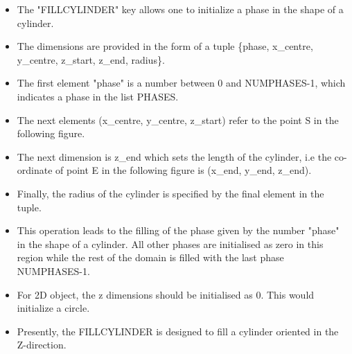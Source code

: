 \documentclass[a4paper,10pt]{article}
\begin{document}
\begin{itemize}
 \item The "FILLCYLINDER" key allows one to initialize a phase in the shape of a cylinder.
 \item The dimensions are provided in the form of a tuple \{phase, x\_centre, y\_centre, z\_start, z\_end, radius\}.
 \item The first element "phase" is a number between 0 and NUMPHASES-1, which indicates a phase in the list PHASES.
 \item The next elements (x\_centre, y\_centre, z\_start) refer to the point S in the following figure.
 \item The next dimension is z\_end which sets the length of the cylinder, i.e the co-ordinate of point E in the following figure is (x\_end, y\_end, z\_end).
 \item Finally, the radius of the cylinder is specified by the final element in the tuple. 
 \item This operation leads to the filling of the phase given by the number "phase" in the shape of a cylinder. All other phases are initialised as zero in this region while the 
 rest of the domain is filled with the last phase NUMPHASES-1.
 \item For 2D object, the z dimensions should be initialised as 0. This would initialize a circle.
 \item Presently, the FILLCYLINDER is designed to fill a cylinder oriented in the Z-direction.
\end{itemize}


\end{document}
